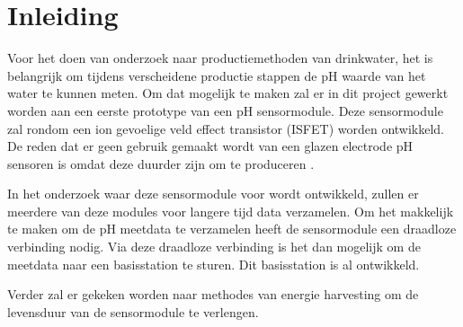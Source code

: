 \section{Inleiding}

Voor het doen van onderzoek naar productiemethoden van drinkwater, het is belangrijk om tijdens verscheidene productie stappen de pH waarde van het water te kunnen meten. Om dat mogelijk te maken zal er in dit project gewerkt worden aan een eerste prototype van een pH sensormodule. Deze sensormodule zal rondom een ion gevoelige veld effect transistor (ISFET) worden ontwikkeld. De reden dat er geen gebruik gemaakt wordt van een glazen electrode pH sensoren is omdat deze duurder zijn om te produceren \cite{duroux1991ionpHISFETltspHmonitoring}. 

In het onderzoek waar deze sensormodule voor wordt ontwikkeld, zullen er meerdere van deze modules voor langere tijd data verzamelen. Om het makkelijk te maken om de pH meetdata te verzamelen heeft de sensormodule een draadloze verbinding nodig. Via deze draadloze verbinding is het dan mogelijk om de meetdata naar een basisstation te sturen. Dit basisstation is al ontwikkeld. 

Verder zal er gekeken worden naar methodes van energie harvesting om de levensduur van de sensormodule te verlengen. 